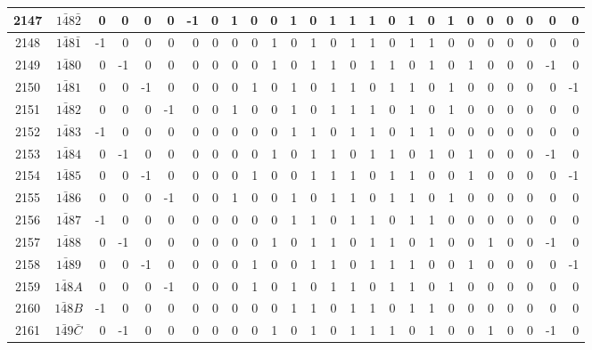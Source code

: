 \documentclass[12 pt]{article}%
\begin{document}
\begin{tiny}
\begin{centering}
\begin{longtable}{|c|c||rrrrrrrrrrrrrrrrrrrrrrrr|}
      \hline
      2147 & $1\bar48\bar2$ & 0 & 0 & 0 & 0 & -1 & 0 & 1 & 0 & 0 & 1 & 0 & 1 & 1 & 1 & 0 & 1 & 0 & 1 & 0 & 0 & 0 & 0 & 0 & 0 \\
      \hline
      2148 & $1\bar48\bar1$ & -1 & 0 & 0 & 0 & 0 & 0 & 0 & 0 & 1 & 0 & 1 & 0 & 1 & 1 & 0 & 1 & 1 & 0 & 0 & 0 & 0 & 0 & 0 & 0 \\
      \hline
      2149 & $1\bar480$ & 0 & -1 & 0 & 0 & 0 & 0 & 0 & 0 & 1 & 0 & 1 & 1 & 0 & 1 & 1 & 0 & 1 & 0 & 1 & 0 & 0 & 0 & -1 & 0 \\
      \hline
      2150 & $1\bar481$ & 0 & 0 & -1 & 0 & 0 & 0 & 0 & 1 & 0 & 1 & 0 & 1 & 1 & 0 & 1 & 1 & 0 & 1 & 0 & 0 & 0 & 0 & 0 & -1 \\
      \hline
      2151 & $1\bar482$ & 0 & 0 & 0 & -1 & 0 & 0 & 1 & 0 & 0 & 1 & 0 & 1 & 1 & 1 & 0 & 1 & 0 & 1 & 0 & 0 & 0 & 0 & 0 & 0 \\
      \hline
      2152 & $1\bar483$ & -1 & 0 & 0 & 0 & 0 & 0 & 0 & 0 & 0 & 1 & 1 & 0 & 1 & 1 & 0 & 1 & 1 & 0 & 0 & 0 & 0 & 0 & 0 & 0 \\
      \hline
      2153 & $1\bar484$ & 0 & -1 & 0 & 0 & 0 & 0 & 0 & 0 & 1 & 0 & 1 & 1 & 0 & 1 & 1 & 0 & 1 & 0 & 1 & 0 & 0 & 0 & -1 & 0 \\
      \hline
      2154 & $1\bar485$ & 0 & 0 & -1 & 0 & 0 & 0 & 0 & 1 & 0 & 0 & 1 & 1 & 1 & 0 & 1 & 1 & 0 & 0 & 1 & 0 & 0 & 0 & 0 & -1 \\
      \hline
      2155 & $1\bar486$ & 0 & 0 & 0 & -1 & 0 & 0 & 1 & 0 & 0 & 1 & 0 & 1 & 1 & 0 & 1 & 1 & 0 & 1 & 0 & 0 & 0 & 0 & 0 & 0 \\
      \hline
      2156 & $1\bar487$ & -1 & 0 & 0 & 0 & 0 & 0 & 0 & 0 & 0 & 1 & 1 & 0 & 1 & 1 & 0 & 1 & 1 & 0 & 0 & 0 & 0 & 0 & 0 & 0 \\
      \hline
      2157 & $1\bar488$ & 0 & -1 & 0 & 0 & 0 & 0 & 0 & 0 & 1 & 0 & 1 & 1 & 0 & 1 & 1 & 0 & 1 & 0 & 0 & 1 & 0 & 0 & -1 & 0 \\
      \hline
      2158 & $1\bar489$ & 0 & 0 & -1 & 0 & 0 & 0 & 0 & 1 & 0 & 0 & 1 & 1 & 0 & 1 & 1 & 1 & 0 & 0 & 1 & 0 & 0 & 0 & 0 & -1 \\
      \hline
      2159 & $1\bar48A$ & 0 & 0 & 0 & -1 & 0 & 0 & 0 & 1 & 0 & 1 & 0 & 1 & 1 & 0 & 1 & 1 & 0 & 1 & 0 & 0 & 0 & 0 & 0 & 0 \\
      \hline
      2160 & $1\bar48B$ & -1 & 0 & 0 & 0 & 0 & 0 & 0 & 0 & 0 & 1 & 1 & 0 & 1 & 1 & 0 & 1 & 1 & 0 & 0 & 0 & 0 & 0 & 0 & 0 \\
      \hline
      2161 & $1\bar49\bar C$ & 0 & -1 & 0 & 0 & 0 & 0 & 0 & 0 & 1 & 0 & 1 & 0 & 1 & 1 & 1 & 0 & 1 & 0 & 0 & 1 & 0 & 0 & -1 & 0 \\

\end{longtable}
\end{centering}
\end{tiny}
\end{document}
